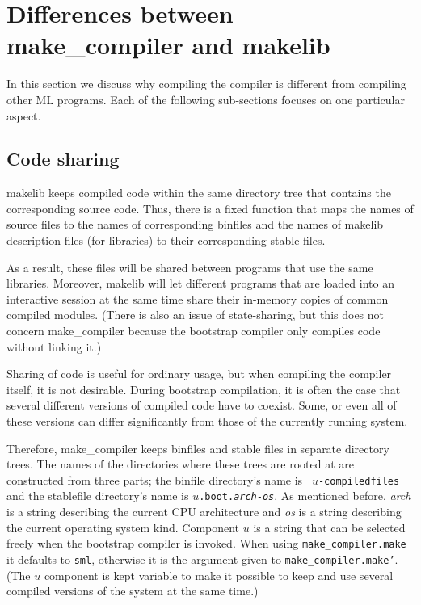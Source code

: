 
\section{Differences between make_compiler and makelib}

In this section we discuss why compiling the compiler is different
from compiling other ML programs.  Each of the following sub-sections
focuses on one particular aspect.

\subsection{Code sharing}

makelib keeps compiled code within the same directory tree that contains
the corresponding source code.  Thus, there is a fixed function
that maps the names of source files to the names of corresponding
binfiles and the names of makelib description files (for libraries) to
their corresponding stable files.

As a result, these files will be shared between programs that use the
same libraries.  Moreover, makelib will let different programs that are
loaded into an interactive session at the same time share their
in-memory copies of common compiled modules.  (There is also an issue of
state-sharing, but this does not concern make_compiler because the bootstrap
compiler only compiles code without linking it.)

Sharing of code is useful for ordinary usage, but when compiling the
compiler itself, it is not desirable.  During bootstrap compilation,
it is often the case that several different versions of compiled code
have to coexist.  Some, or even all of these versions can differ
significantly from those of the currently running system.

Therefore, make_compiler keeps binfiles and stable files in separate directory
trees.  The names of the directories where these trees are rooted at
are constructed from three parts; the binfile directory's name is {\tt
$u$-compiledfiles} and the stablefile directory's name is
{\tt $u$.boot{.\it arch}-{\it os}}.  As mentioned before, {\it arch}
is a string describing the current CPU architecture and {\it os} is a
string describing the current operating system kind. Component $u$ is
a string that can be selected freely when the bootstrap compiler is
invoked.  When using {\tt make_compiler.make} it defaults to {\tt sml},
otherwise it is the argument given to {\tt make_compiler.make'}.  (The $u$
component is kept variable to make it possible to keep and use several
compiled versions of the system at the same time.)

